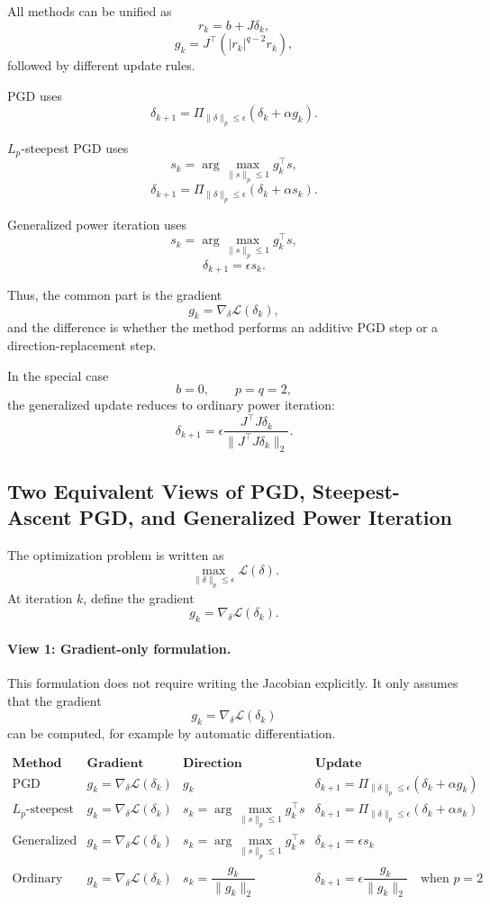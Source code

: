 \documentclass{article}
\begin{document}
All methods can be unified as
\[
r_k=b+J\delta_k,
\]
\[
g_k
=
J^\top\left(|r_k|^{q-2}r_k\right),
\]
followed by different update rules.

PGD uses
\[
\delta_{k+1}
=
\Pi_{\|\delta\|_p\le\epsilon}
(\delta_k+\alpha g_k).
\]

$L_p$-steepest PGD uses
\[
s_k
=
\arg\max_{\|s\|_p\le1}g_k^\top s,
\]
\[
\delta_{k+1}
=
\Pi_{\|\delta\|_p\le\epsilon}
(\delta_k+\alpha s_k).
\]

Generalized power iteration uses
\[
s_k
=
\arg\max_{\|s\|_p\le1}g_k^\top s,
\]
\[
\delta_{k+1}
=
\epsilon s_k.
\]

Thus, the common part is the gradient
\[
g_k=\nabla_\delta \mathcal{L}(\delta_k),
\]
and the difference is whether the method performs an additive PGD step or a direction-replacement step.

In the special case
\[
b=0,
\qquad
p=q=2,
\]
the generalized update reduces to ordinary power iteration:
\[
\delta_{k+1}
=
\epsilon
\frac{J^\top J\delta_k}
{\|J^\top J\delta_k\|_2}.
\]

\subsection{Two Equivalent Views of PGD, Steepest-Ascent PGD, and Generalized Power Iteration}

The optimization problem is written as
\[
\max_{\|\delta\|_p\le \epsilon} \mathcal L(\delta).
\]
At iteration $k$, define the gradient
\[
g_k=\nabla_\delta \mathcal L(\delta_k).
\]

\paragraph{View 1: Gradient-only formulation.}
This formulation does not require writing the Jacobian explicitly. It only assumes that the gradient
\[
g_k=\nabla_\delta \mathcal L(\delta_k)
\]
can be computed, for example by automatic differentiation.

\[
\begin{array}{c|c|c|c}
\textbf{Method}
&
\textbf{Gradient}
&
\textbf{Direction}
&
\textbf{Update}
\\
\hline
\text{PGD}
&
g_k=\nabla_\delta \mathcal L(\delta_k)
&
g_k
&
\delta_{k+1}
=
\Pi_{\|\delta\|_p\le\epsilon}
\left(
\delta_k+\alpha g_k
\right)
\\
\hline
L_p\text{-steepest PGD}
&
g_k=\nabla_\delta \mathcal L(\delta_k)
&
s_k=
\arg\max_{\|s\|_p\le1}
g_k^\top s
&
\delta_{k+1}
=
\Pi_{\|\delta\|_p\le\epsilon}
\left(
\delta_k+\alpha s_k
\right)
\\
\hline
\text{Generalized Power Iteration}
&
g_k=\nabla_\delta \mathcal L(\delta_k)
&
s_k=
\arg\max_{\|s\|_p\le1}
g_k^\top s
&
\delta_{k+1}
=
\epsilon s_k
\\
\hline
\text{Ordinary Power Iteration}
&
g_k=\nabla_\delta \mathcal L(\delta_k)
&
s_k=\dfrac{g_k}{\|g_k\|_2}
&
\delta_{k+1}
=
\epsilon\dfrac{g_k}{\|g_k\|_2}
\quad
\text{when } p=2
\\
\end{array}
\]
\end{document}
